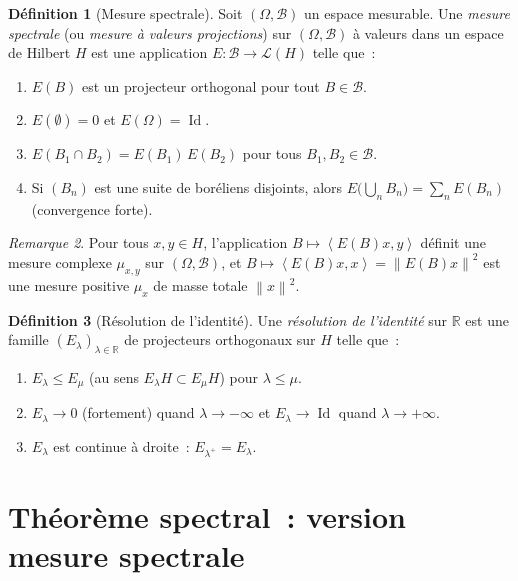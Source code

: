 \documentclass[a4paper,12pt]{book}
\DeclareMathOperator{\Id}{Id}
\newcommand{\R}{\mathbb{R}}
\newcommand{\norm}[1]{\left\| #1 \right\|}
\newcommand{\inner}[2]{\left\langle #1, #2 \right\rangle}
\theoremstyle{definition}
\newtheorem{definition}{Définition}[chapter]
\theoremstyle{plain}
\theoremstyle{remark}
\newtheorem{remarque}[definition]{Remarque}
\begin{document}
\begin{definition}[Mesure spectrale]
\label{def:mesure-spectrale}
Soit $(\Omega, \mathcal{B})$ un espace mesurable. Une \emph{mesure spectrale} (ou
\emph{mesure à valeurs projections}) sur $(\Omega, \mathcal{B})$ à valeurs dans un espace
de Hilbert $H$ est une application $E : \mathcal{B} \to \mathcal{L}(H)$ telle que~:
\begin{enumerate}[label=(\roman*)]
  \item $E(B)$ est un projecteur orthogonal pour tout $B \in \mathcal{B}$.
  \item $E(\emptyset) = 0$ et $E(\Omega) = \Id$.
  \item $E(B_1 \cap B_2) = E(B_1)\,E(B_2)$ pour tous $B_1, B_2 \in \mathcal{B}$.
  \item Si $(B_n)$ est une suite de boréliens disjoints, alors
        $E\bigl(\bigcup_n B_n\bigr) = \sum_n E(B_n)$ (convergence forte).
\end{enumerate}
\end{definition}

\begin{remarque}
Pour tous $x, y \in H$, l'application $B \mapsto \inner{E(B)x}{y}$ définit une mesure
complexe $\mu_{x,y}$ sur $(\Omega, \mathcal{B})$, et $B \mapsto \inner{E(B)x}{x} = \norm{E(B)x}^2$
est une mesure positive $\mu_x$ de masse totale $\norm{x}^2$.
\end{remarque}

\begin{definition}[Résolution de l'identité]
\label{def:resolution-identite}
Une \emph{résolution de l'identité} sur $\R$ est une famille $(E_\lambda)_{\lambda \in \R}$
de projecteurs orthogonaux sur $H$ telle que~:
\begin{enumerate}[label=(\roman*)]
  \item $E_\lambda \le E_\mu$ (au sens $E_\lambda H \subset E_\mu H$) pour $\lambda \le \mu$.
  \item $E_\lambda \to 0$ (fortement) quand $\lambda \to -\infty$ et
        $E_\lambda \to \Id$ quand $\lambda \to +\infty$.
  \item $E_\lambda$ est continue à droite~: $E_{\lambda^+} = E_\lambda$.
\end{enumerate}
\end{definition}

\section{Théorème spectral~: version mesure spectrale}
\end{document}
